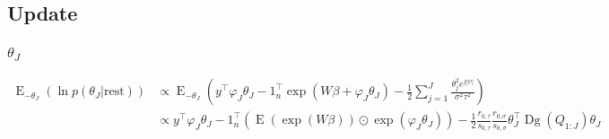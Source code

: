 \documentclass[11pt]{article}
\newcommand{\opn}{\operatorname}
\begin{document}
\subsection{Update}
\subsubsection{$\theta_{J}$}
  \begin{align*}
    \opn{E}_{-\theta_{J}}\left(\ln p\left(\theta_{J}|\text{rest}\right)\right) &\propto \opn{E}_{-\theta_{J}}\left(y^{\top}\varphi_{J}\theta_{J}-1_{n}^{\top}\exp\left(W\beta + \varphi_{J}\theta_{J}\right) -\frac{1}{2}\sum_{j=1}^{J}\frac{\theta_{j}^{2}e^{j\left|\psi\right|}}{\sigma^{2}\tau^{2}}\right)\\
    &\propto y^{\top}\varphi_{J}\theta_{J} -1_{n}^{\top}\left(\opn{E}\left(\exp\left(W\beta\right)\right)\odot \exp\left(\varphi_{J}\theta_{J}\right)\right) -\frac{1}{2}\frac{r_{0,\tau}}{s_{0,\tau}}\frac{r_{0,\sigma}}{s_{0,\sigma}}\theta_{J}^{\top}\opn{Dg}\left(Q_{1:J}\right)\theta_{J}
  \end{align*}
\end{document}
